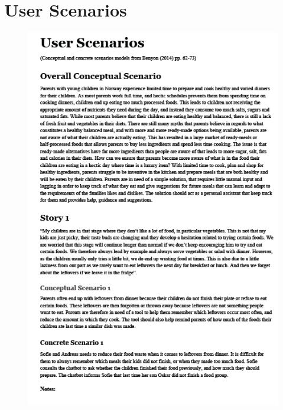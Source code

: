 \section{User Scenarios}
    \label{Userscenarios}
     \begin{figure}[H]
        \centering
        \includegraphics[scale=0.8]{figures/UScen1.png}
    \end{figure}
